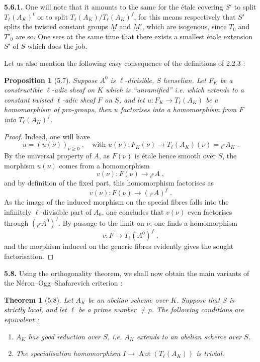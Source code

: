 \documentclass[11pt]{article}
\theoremstyle{plain}
\newtheorem{proposition}[theorem]{Proposition}
\newtheorem{theoreme}[theorem]{Theorem}
\theoremstyle{definition}
\theoremstyle{remark}
\DeclareMathOperator{\Aut}{Aut}
\newcommand{\Tl}{T_\ell}
\begin{document}
\noindent\textbf{5.6.1.} One will note that it amounts to the same for the
\'etale covering $S'$ to split $\Tl(A_K)^t$ or to split
$\Tl(A_K)/\Tl(A_K)^f$, for this means respectively that $S'$ splits the
twisted constant groups $\underline{M}$ and $\underline{M}'$, which are
isogenous, since $T_0$ and $T'_0$ are so. One sees at the same time that
there exists a smallest \'etale extension $S'$ of $S$ which does the job.

Let us also mention the following easy consequence of the definitions of
2.2.3 :

\begin{proposition}[5.7]
Suppose $A^0$ is $\ell$-divisible, $S$ henselian. Let $F_K$ be a
constructible $\ell$-adic sheaf on $K$ which is ``unramified'' i.e.
which extends to a constant twisted $\ell$-adic sheaf $F$ on $S$, and
let $u \colon F_K \to \Tl(A_K)$ be a homomorphism of pro-groups, then
$u$ factorises into a homomorphism from $F$ into $\Tl(A_K)^f$.
\end{proposition}

\begin{proof}
Indeed, one will have
\begin{equation}
u = (u(\nu))_{\nu \geq 0} \; , \quad
\text{with } u(\nu) \colon F_K(\nu) \longrightarrow
\Tl(A_K)(\nu) = {}_{\ell^{\nu}}\!A_K \; .
\end{equation}
By the universal property of $A$, as $F(\nu)$ is \'etale hence smooth
over $S$, the morphism $u(\nu)$ comes from a homomorphism
\[
v(\nu) \colon F(\nu) \longrightarrow {}_{\ell^{\nu}}\!A \; ,
\]
and by definition of the fixed part, this homomorphism factorises as
\[
v(\nu) \colon F(\nu) \longrightarrow ({}_{\ell^{\nu}}\!A)^f \; .
\]
As the image of the induced morphism on the special fibres falls into
the infinitely $\ell$-divisible part of $A_0$, one concludes that
$v(\nu)$ even factorises through $({}_{\ell^{\nu}}\!A^0)^f$. By passage
to the limit on $\nu$, one finds a homomorphism
\[
v \colon F \longrightarrow \Tl(A^0)^f \; ,
\]
and the morphism induced on the generic fibres evidently gives the
sought factorisation.
\end{proof}

\noindent\textbf{5.8.} Using the orthogonality theorem, we shall now
obtain the main variants of the N\'eron--Ogg--Shafarevich criterion :

\begin{theoreme}[5.8]
Let $A_K$ be an abelian scheme over $K$. Suppose that $S$ is strictly
local, and let $\ell$ be a prime number $\neq p$. The following
conditions are equivalent :
\begin{enumerate}[label=\emph{(\roman*)}]
\item $A_K$ has \emph{good reduction} over $S$, i.e. $A_K$ extends to an
abelian scheme over $S$.
\item The specialisation homomorphism $I \to \Aut(\Tl(A_K))$ is
\emph{trivial}.
\end{enumerate}
\end{theoreme}
\end{document}
